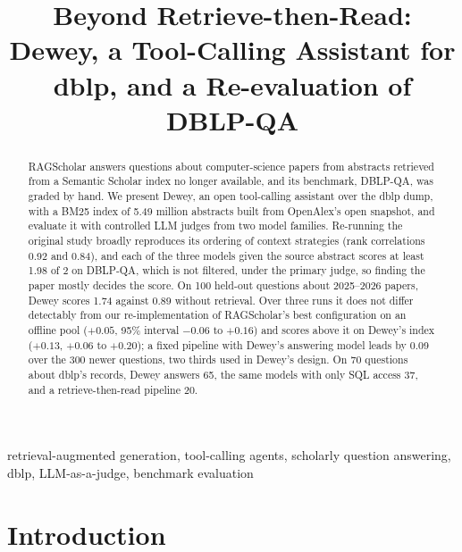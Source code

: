\documentclass[conference]{IEEEtran}
\newcommand{\dq}{DBLP-QA}
\begin{document}

\title{Beyond Retrieve-then-Read: Dewey, a Tool-Calling Assistant for dblp, and a Re-evaluation of
DBLP-QA}

\author{
}

\maketitle

\begin{abstract}
RAGScholar answers questions about computer-science papers from abstracts retrieved from a Semantic
Scholar index no longer available, and its benchmark, DBLP-QA, was graded by hand. We present Dewey, an
open tool-calling assistant over the dblp dump, with a BM25 index of 5.49 million abstracts built from
OpenAlex's open snapshot, and evaluate it with controlled LLM judges from two model families. Re-running the original study broadly reproduces its
ordering of context strategies (rank correlations 0.92 and 0.84), and each of the three models given the
source abstract scores at least 1.98 of 2 on \dq{}, which is not filtered, under the primary judge, so finding the paper mostly decides the score.
On 100 held-out questions about 2025--2026 papers, Dewey scores 1.74 against 0.89 without retrieval. Over
three runs it does not differ detectably from our re-implementation of RAGScholar's best configuration on
an offline pool ($+0.05$, 95\% interval $-0.06$ to $+0.16$) and scores above it on Dewey's index
($+0.13$, $+0.06$ to $+0.20$); a fixed pipeline with Dewey's answering model leads by 0.09 over the 300
newer questions, two thirds used in Dewey's design. On 70 questions about dblp's records, Dewey
answers 65, the same models with only SQL access 37, and a retrieve-then-read pipeline 20.
\end{abstract}

\begin{IEEEkeywords}
retrieval-augmented generation, tool-calling agents, scholarly question answering, dblp,
LLM-as-a-judge, benchmark evaluation
\end{IEEEkeywords}

\section{Introduction}
\end{document}

